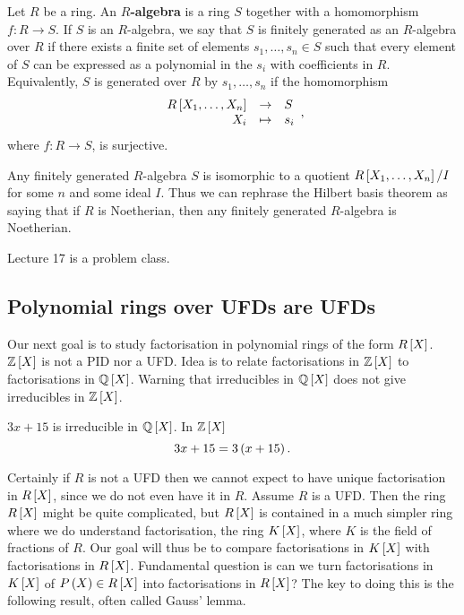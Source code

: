 \begin{definition}
Let $ R $ be a ring. An \textbf{$ R $-algebra} is a ring $ S $ together with a homomorphism $ f : R \to S $. If $ S $ is an $ R $-algebra, we say that $ S $ is finitely generated as an $ R $-algebra over $ R $ if there exists a finite set of elements $ s_1, \dots, s_n \in S $ such that every element of $ S $ can be expressed as a polynomial in the $ s_i $ with coefficients in $ R $. Equivalently, $ S $ is generated over $ R $ by $ s_1, \dots, s_n $ if the homomorphism
$$ \function{R\sb{X_1, \dots, X_n}}{S}{X_i}{s_i}, $$
where $ f : R \to S $, is surjective.
\end{definition}

\begin{note*}
Any finitely generated $ R $-algebra $ S $ is isomorphic to a quotient $ R\sb{X_1, \dots, X_n} / I $ for some $ n $ and some ideal $ I $. Thus we can rephrase the Hilbert basis theorem as saying that if $ R $ is Noetherian, then any finitely generated $ R $-algebra is Noetherian.
\end{note*}


Lecture 17 is a problem class.


\subsection{Polynomial rings over UFDs are UFDs}

Our next goal is to study factorisation in polynomial rings of the form $ R\sb{X} $. $ \Z\sb{X} $ is not a PID nor a UFD. Idea is to relate factorisations in $ \Z\sb{X} $ to factorisations in $ \Q\sb{X} $. Warning that irreducibles in $ \Q\sb{X} $ does not give irreducibles in $ \Z\sb{X} $.

\begin{example*}
$ 3x + 15 $ is irreducible in $ \Q\sb{X} $. In $ \Z\sb{X} $
$$ 3x + 15 = 3\rb{x + 15}. $$
\end{example*}

Certainly if $ R $ is not a UFD then we cannot expect to have unique factorisation in $ R\sb{X} $, since we do not even have it in $ R $. Assume $ R $ is a UFD. Then the ring $ R\sb{X} $ might be quite complicated, but $ R\sb{X} $ is contained in a much simpler ring where we do understand factorisation, the ring $ K\sb{X} $, where $ K $ is the field of fractions of $ R $. Our goal will thus be to compare factorisations in $ K\sb{X} $ with factorisations in $ R\sb{X} $. Fundamental question is can we turn factorisations in $ K\sb{X} $ of $ P\rb{X} \in R\sb{X} $ into factorisations in $ R\sb{X} $? The key to doing this is the following result, often called Gauss' lemma.

